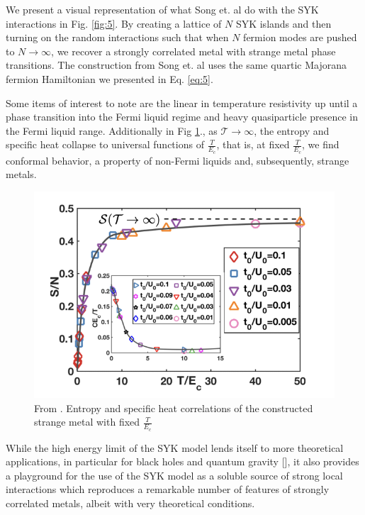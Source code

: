 \documentclass[reprint]{revtex4-2}
\begin{document}
We present a visual representation of what Song et. al do with the SYK interactions in Fig. \ref{fig:5}. By creating a lattice of $N$ SYK islands and then turning on the random interactions such that when $N$ fermion modes are pushed to $N \rightarrow \infty$, we recover a strongly correlated metal with strange metal phase transitions.
The construction from Song et. al uses the same quartic Majorana fermion Hamiltonian we presented in Eq. \ref{eq:5}. 
\par Some items of interest to note are the linear in temperature resistivity up until a phase transition into the Fermi liquid regime and heavy quasiparticle presence in the Fermi liquid range. Additionally in Fig \ref{fig:6}., as $\mathcal{T} \rightarrow \infty $, the entropy and specific heat collapse to universal functions of $\frac{T}{E_{c}}$, that is, at fixed $\frac{T}{E_{c}}$, we find conformal behavior, a property of non-Fermi liquids and, subsequently, strange metals. 
\begin{figure}[H]
    \centering
    \includegraphics[scale = 0.8]{StrangeMetal.png}
    \caption{From \cite{Song_2017}. Entropy and specific heat correlations of the constructed strange metal with fixed $\frac{T}{E_{c}}$}
    \label{fig:6}
\end{figure}
\par While the high energy limit of the SYK model lends itself to more theoretical applications, in particular for black holes and quantum gravity [\cite{PhysRevX.5.041025}\cite{Sachdev:2022qnu}\cite{Sachdev:2023try}], it also provides a playground for the use of the SYK model as a soluble source of strong local interactions which reproduces a remarkable number of features of strongly correlated metals, albeit with very theoretical conditions. 
\end{document}
